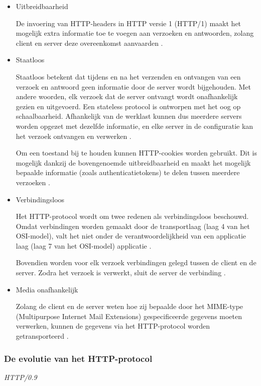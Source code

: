 \begin{itemize}
    \item Uitbreidbaarheid

    De invoering van HTTP-headers in HTTP versie 1 (HTTP/1) \autocite{MDN2023a} maakt het mogelijk extra informatie toe te voegen aan verzoeken en antwoorden, zolang client en server deze overeenkomst aanvaarden \autocite{Paessler}.
    
    \item Staatloos
    
    Staatloos betekent dat tijdens en na het verzenden en ontvangen van een verzoek en antwoord geen informatie door de server wordt bijgehouden. Met andere woorden, elk verzoek dat de server ontvangt wordt onafhankelijk gezien en uitgevoerd. Een stateless protocol is ontworpen met het oog op schaalbaarheid. Afhankelijk van de werklast kunnen dus meerdere servers worden opgezet met dezelfde informatie, en elke server in de configuratie kan het verzoek ontvangen en verwerken \autocite{Paessler}.
    
    Om een toestand bij te houden kunnen HTTP-cookies worden gebruikt. Dit is mogelijk dankzij de bovengenoemde uitbreidbaarheid en maakt het mogelijk bepaalde informatie (zoals authenticatietokens) te delen tussen meerdere verzoeken \autocite{MDN2023}.
    
    \item Verbindingsloos
    
    Het HTTP-protocol wordt om twee redenen als verbindingsloos beschouwd. Omdat verbindingen worden gemaakt door de transportlaag (laag 4 van het OSI-model), valt het niet onder de verantwoordelijkheid van een applicatie laag (laag 7 van het OSI-model) applicatie \autocite{MDN2023}.
    
    Bovendien worden voor elk verzoek verbindingen gelegd tussen de client en de server. Zodra het verzoek is verwerkt, sluit de server de verbinding \autocite{Paessler}.
    
    \item Media onafhankelijk
    
    Zolang de client en de server weten hoe zij bepaalde door het MIME-type (Multipurpose Internet Mail Extensions) gespecificeerde gegevens moeten verwerken, kunnen de gegevens via het HTTP-protocol worden getransporteerd \autocite{Paessler}.
\end{itemize}

\subsubsection{De evolutie van het HTTP-protocol}
\emph{HTTP/0.9}

